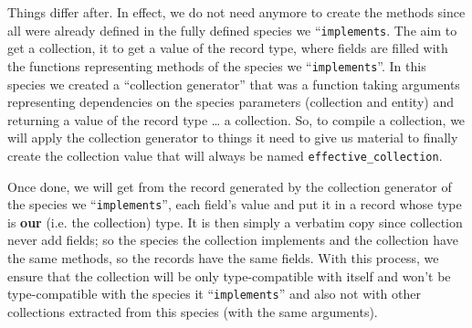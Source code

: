 Things differ after. In effect, we do not need anymore to create the
methods since all were already defined in the fully defined species we
``{\tt implements}. The aim to get a collection, it to get a value of
the record type, where fields are filled with the functions
representing methods of the species we ``{\tt implements}''. In this
species we created a ``collection generator'' that was a function
taking arguments representing dependencies on the species parameters
(collection and entity) and returning a value of the record type \ldots
a collection. So, to compile a collection, we will apply the
collection generator to things it need to give us material to finally
create the collection value that will always be named
{\tt effective\_collection}.

Once done, we will get from the record generated by the collection
generator of the species we ``{\tt implements}'', each field's value
and put it in a record whose type is {\bf our} (i.e. the collection)
type. It is then simply a verbatim copy since collection never add
fields; so the species the collection implements and the collection
have the same methods, so the records have the same fields. With this
process, we ensure that the collection will be only type-compatible
with itself and won't be type-compatible with the species it
``{\tt implements}'' and also not with other collections extracted
from this species (with the same arguments).

